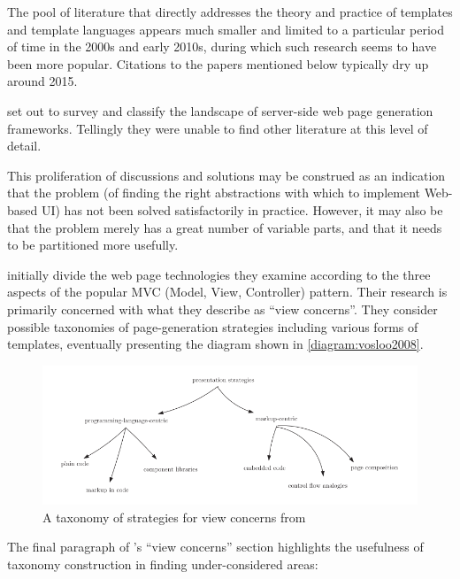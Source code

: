 The pool of literature that directly addresses the theory and practice of templates and \gls{template language}s appears much smaller and limited to a particular period of time in the 2000s and early 2010s, during which such research seems to have been more popular. Citations to the papers mentioned below typically dry up around 2015.

\citet{Vosloo2008} set out to survey and classify the landscape of server-side web page generation frameworks. Tellingly they were unable to find other literature at this level of detail.

\begin{displayquote}
This proliferation of discussions and solutions may be construed as an indication that the problem (of finding the right abstractions with which to implement Web-based UI) has not been solved satisfactorily in practice. However, it may also be that the problem merely has a great number of variable parts, and that it needs to be partitioned more usefully. \citep{Vosloo2008}
\end{displayquote}

\label{A116}
\citeauthor{Vosloo2008} initially divide the web page technologies they examine according to the three aspects of the popular MVC (Model, View, Controller) pattern. Their research is primarily concerned with what they describe as \enquote{view concerns}. They consider possible taxonomies of page-generation strategies including various forms of templates, eventually presenting the diagram shown in \autoref{diagram:vosloo2008}.

\begin{figure}[ht!]
\centering
\includegraphics[width=130mm]{Figures/taxonomy.png}
\caption{A taxonomy of strategies for view concerns from \citet{Vosloo2008}}
\label{diagram:vosloo2008}
\end{figure}

The final paragraph of \citeauthor{Vosloo2008}'s \enquote{view concerns} section highlights the usefulness of taxonomy construction in finding under-considered areas:


